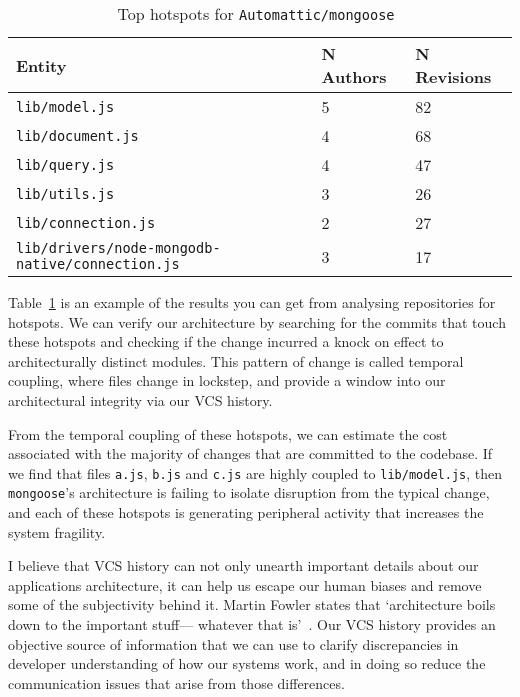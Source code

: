 \documentclass[11pt]{article}
\begin{document}
\begin{table}
  \begin{tabular}{ | l | l | l | }
    \hline
    \textbf{Entity} & \textbf{N Authors} & \textbf{N Revisions} \\
    \hline \hline
    \texttt{lib/model.js} & 5 & 82 \\ \hline
    \texttt{lib/document.js} & 4 & 68 \\ \hline
    \texttt{lib/query.js} & 4 & 47 \\ \hline
    \texttt{lib/utils.js} & 3 & 26 \\ \hline
    \texttt{lib/connection.js} & 2 & 27 \\ \hline
    \texttt{lib/drivers/node-mongodb-native/connection.js} & 3 & 17 \\
    \hline
  \end{tabular}
  \caption{Top hotspots for \texttt{Automattic/mongoose}~\cite{mongoose}}
  \label{table:mongooseHotspots}
\end{table}

Table~\ref{table:mongooseHotspots} is an example of the results you can get from
analysing repositories for hotspots. We can verify our architecture by searching
for the commits that touch these hotspots and checking if the change incurred a
knock on effect to architecturally distinct modules. This pattern of change is
called temporal coupling, where files change in lockstep, and provide a window
into our architectural integrity via our VCS history.

From the temporal coupling of these hotspots, we can estimate the cost
associated with the majority of changes that are committed to the codebase.  If
we find that files \texttt{a.js}, \texttt{b.js} and \texttt{c.js} are highly
coupled to \texttt{lib/model.js}, then \texttt{mongoose}'s architecture is
failing to isolate disruption from the typical change, and each of these
hotspots is generating peripheral activity that increases the system fragility.

I believe that VCS history can not only unearth important details about our
applications architecture, it can help us escape our human biases and remove
some of the subjectivity behind it. Martin Fowler states that `architecture
boils down to the important stuff— whatever that
is'~\cite{patternsOfEnterpriseApplicationArchitecture}. Our VCS history provides
an objective source of information that we can use to clarify discrepancies in
developer understanding of how our systems work, and in doing so reduce the
communication issues that arise from those differences.


\medskip


\newpage
\end{document}
